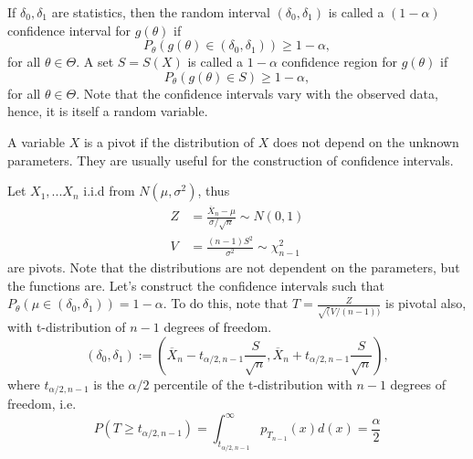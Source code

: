 \begin{definition}
	If $\delta_0, \delta_1$ are statistics, then the random interval $(\delta_0,\delta_1)$
	is called a $(1-\alpha)$ confidence interval for $g(\theta)$ if
	\begin{equation}
		P_\theta(g(\theta)\in (\delta_0,\delta_1))\geq 1- \alpha,
	\end{equation}
	for all $\theta \in \Theta$. A set $S = S(X)$ is called a $1-\alpha$
	confidence region for $g(\theta)$ if
	\begin{equation}
		P_\theta(g(\theta)\in S) \geq 1-\alpha,
	\end{equation}
	for all $\theta \in \Theta$.
	Note that the confidence intervals vary with the observed data, hence,
	it is itself a random variable.
\end{definition}

\begin{definition}[Pivots]
	A variable $X$ is a pivot if the distribution of $X$ does not depend on the
	unknown parameters. They are usually useful for the construction of
	confidence intervals.
\end{definition}

\begin{example}
	Let $X_1,...X_n$ i.i.d from $N(\mu,\sigma^2)$, thus
	\begin{align*}
		Z & = \frac{\overline X_n - \mu}{\sigma/\sqrt n} \sim N(0,1) \\
		V & = \frac{(n-1)S^2}{\sigma^2} \sim \chi_{n-1}^2
	\end{align*}
	are pivots. Note that the distributions are not dependent on the parameters,
	but the functions are. Let's construct the confidence intervals
	such that $P_\theta(\mu \in (\delta_0,\delta_1)) = 1-\alpha$. To do this,
	note that $T = \frac{Z}{\sqrt(V/(n-1))}$ is pivotal also, with t-distribution
	of $n-1$ degrees of freedom.
	\begin{equation}
		(\delta_0,\delta_1):=\left(
		\overline X_n - t_{\alpha/2, n-1}\frac{S}{\sqrt n},
		\overline X_n + t_{\alpha/2, n-1}\frac{S}{\sqrt n}
		\right),
	\end{equation}
	where $t_{\alpha/2,n-1}$ is the $\alpha/2$ percentile of the t-distribution
	with $n-1$ degrees of freedom, i.e.
	\begin{equation}
		P(T \geq t_{\alpha/2,n-1}) = \int_{t_{\alpha/2,n-1}}^{\infty}
		p_{T_{n-1}}(x)d(x) = \frac{\alpha}{2}
	\end{equation}
\end{example}

